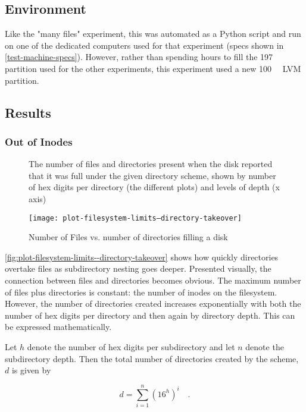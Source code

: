 \subsection{Environment}

Like the "many files" experiment, this was automated as a Python script and run
on one of the dedicated computers used for that experiment (specs shown in
\autoref{test-machine-specs}). However, rather than spending hours to fill the
\SI{197}{\gibi\byte} partition used for the other experiments, this experiment
used a new \SI{100}{\mebi\byte} LVM partition.


\subsection{Results}

\subsubsection{Out of Inodes}

\begin{figure}[]
    \caption{Number of Files vs. number of directories filling a disk}
    \label{fig:plot-filesystem-limits--directory-takeover}
    \centering

    The number of files and directories present when the disk reported that it
    was full under the given directory scheme, shown by number of hex digits per
    directory (the different plots) and levels of depth (x axis)

    \texttt{[image: plot-filesystem-limits--directory-takeover]}
\end{figure}

\autoref{fig:plot-filesystem-limits--directory-takeover} shows how quickly
directories overtake files as subdirectory nesting goes deeper. Presented
visually, the connection between files and directories becomes obvious. The
maximum number of files plus directories is constant: the number of inodes on
the filesystem. However, the number of directories created increases
exponentially with both the number of hex digits per directory and then again by
directory depth. This can be expressed mathematically.

Let $h$ denote the number of hex digits per subdirectory and let $n$ denote the
subdirectory depth. Then the total number of directories created by the scheme,
$d$ is given by

\begin{equation}
    d = \sum_{i=1}^n \left( 16^h \right)^i \quad.
\end{equation}


